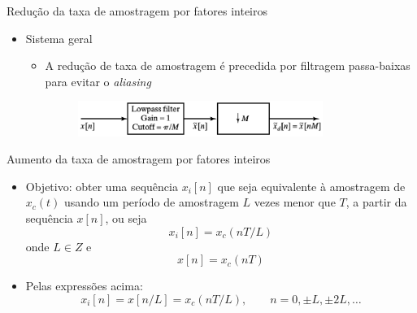 \begin{slide}{Redução da taxa de amostragem por fatores inteiros}
	\begin{itemize}
		\item Sistema geral
			\begin{itemize}
				\item A redução de taxa de amostragem é precedida por filtragem passa-baixas para evitar o \emph{aliasing}
				\begin{figure}
					\centering
					\includegraphics[width=0.8\textwidth]{figs/4-22.eps}
		        	\end{figure}
			\end{itemize}
	\end{itemize}
\end{slide}

\begin{slide}{Aumento da taxa de amostragem por fatores inteiros}
	\begin{itemize}
		\item Objetivo: obter uma sequência $x_i[n]$ que seja equivalente à amostragem de $x_c(t)$ usando um período de amostragem $L$ vezes menor que $T$, a partir da sequência $x[n]$, ou seja 
			\begin{equation*}
				x_i[n] = x_c(nT/L)
			\end{equation*}
			onde $L \in Z$ e 
			\begin{equation*}
				x[n] = x_c(nT)
			\end{equation*}
		\item Pelas expressões acima:
			\begin{equation*}
				x_i[n] = x[n/L] = x_c(nT/L), \qquad n= 0, \pm L, \pm 2L, \dots
			\end{equation*}
	\end{itemize}
\end{slide}

